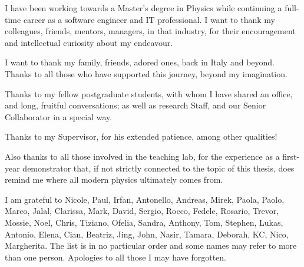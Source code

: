 I have been working towards a Master's degree in Physics
while continuing a full-time career as a software engineer and IT professional.
I want to thank my colleagues, friends, mentors, managers, in that industry,
for their encouragement and intellectual curiosity about my endeavour.

I want to thank my family, friends, adored ones, back in Italy and beyond.
Thanks to all those who have supported this journey, beyond my imagination.

Thanks to my fellow postgraduate students, with whom I have shared
an office, and long, fruitful conversations;
as well as research Staff, and our Senior Collaborator in a special way.

Thanks to my Supervisor, for his extended patience, among other qualities!

Also thanks to all those involved in the teaching lab,
for the experience as a first-year demonstrator that,
if not strictly connected to the topic of this thesis,
does remind me where all modern physics ultimately comes from.

I am grateful to Nicole, Paul, Irfan, Antonello, Andreas, Mirek, Paola, Paolo, Marco,
Jalal, Clarissa, Mark, David, Sergio, Rocco, Fedele, Rosario, Trevor, Mossie, Noel, Chris, Tiziano, Ofelia,
Sandra, Anthony, Tom, Stephen, Lukas, Antonio, Elena, Cian, Beatriz, Jing, John, Nasir, Tamara,
Deborah, KC, Nico, Margherita. The list is in no particular order and some names may refer to more than one person.
Apologies to all those I may have forgotten.
